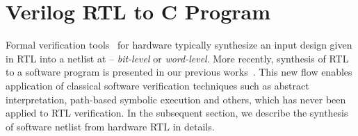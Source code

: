 \section{Verilog RTL to C Program}\label{sec:abstraction}
%
Formal verification tools~\cite{abc,DBLP:conf/fmcad/BradleyM07,vis} for 
hardware typically synthesize an input design given in RTL into a netlist  
at -- \emph{bit-level} or \emph{word-level}. 
%
%
More recently, synthesis of RTL to a software program is presented 
in our previous works~\cite{mkm2015,mtk2016}.  This new flow enables application 
of classical software verification techniques such as abstract interpretation, path-based 
symbolic execution and others, which has never been applied to RTL verification.  
In the subsequent section, we describe the synthesis of software netlist 
from hardware RTL in details.     
